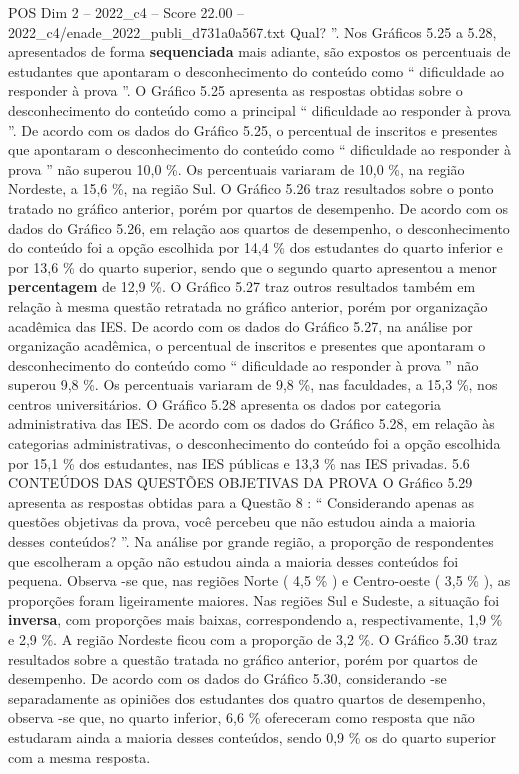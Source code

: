 \begin{textsample}{POS Dim 2 – 2022\_c4 – Score 22.00 – 2022\_c4/enade\_2022\_publi\_d731a0a567.txt}
Qual? ”.
Nos Gráficos 5.25 a 5.28, apresentados de forma \textbf{sequenciada} mais adiante, são expostos os percentuais de estudantes que apontaram o desconhecimento do conteúdo como “ dificuldade ao responder à prova ”.
O Gráfico 5.25 apresenta as respostas obtidas sobre o desconhecimento do conteúdo como a principal “ dificuldade ao responder à prova ”.
De acordo com os dados do Gráfico 5.25, o percentual de inscritos e presentes que apontaram o desconhecimento do conteúdo como “ dificuldade ao responder à prova ” não superou 10,0 \%.
Os percentuais variaram de 10,0 \%, na região Nordeste, a 15,6 \%, na região Sul.
O Gráfico 5.26 traz resultados sobre o ponto tratado no gráfico anterior, porém por quartos de desempenho.
De acordo com os dados do Gráfico 5.26, em relação aos quartos de desempenho, o desconhecimento do conteúdo foi a opção escolhida por 14,4 \% dos estudantes do quarto inferior e por 13,6 \% do quarto superior, sendo que o segundo quarto apresentou a menor \textbf{percentagem} de 12,9 \%.
O Gráfico 5.27 traz outros resultados também em relação à mesma questão retratada no gráfico anterior, porém por organização acadêmica das IES.
De acordo com os dados do Gráfico 5.27, na análise por organização acadêmica, o percentual de inscritos e presentes que apontaram o desconhecimento do conteúdo como “ dificuldade ao responder à prova ” não superou 9,8 \%.
Os percentuais variaram de 9,8 \%, nas faculdades, a 15,3 \%, nos centros universitários.
O Gráfico 5.28 apresenta os dados por categoria administrativa das IES.
De acordo com os dados do Gráfico 5.28, em relação às categorias administrativas, o desconhecimento do conteúdo foi a opção escolhida por 15,1 \% dos estudantes, nas IES públicas e 13,3 \% nas IES privadas. 5.6 CONTEÚDOS DAS QUESTÕES OBJETIVAS DA PROVA O Gráfico 5.29 apresenta as respostas obtidas para a Questão 8 : “ Considerando apenas as questões objetivas da prova, você percebeu que não estudou ainda a maioria desses conteúdos? ”.
Na análise por grande região, a proporção de respondentes que escolheram a opção não estudou ainda a maioria desses conteúdos foi pequena.
Observa -se que, nas regiões Norte ( 4,5 \% ) e Centro-oeste ( 3,5 \% ), as proporções foram ligeiramente maiores.
Nas regiões Sul e Sudeste, a situação foi \textbf{inversa}, com proporções mais baixas, correspondendo a, respectivamente, 1,9 \% e 2,9 \%.
A região Nordeste ficou com a proporção de 3,2 \%.
O Gráfico 5.30 traz resultados sobre a questão tratada no gráfico anterior, porém por quartos de desempenho.
De acordo com os dados do Gráfico 5.30, considerando -se separadamente as opiniões dos estudantes dos quatro quartos de desempenho, observa -se que, no quarto inferior, 6,6 \% ofereceram como resposta que não estudaram ainda a maioria desses conteúdos, sendo 0,9 \% os do quarto superior com a mesma resposta.

\end{textsample}
